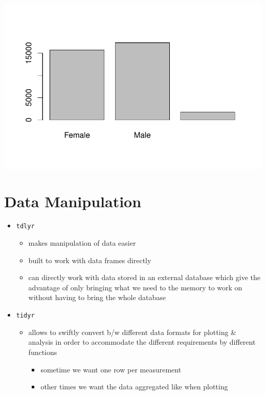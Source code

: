\documentclass[
  letterpaper,
  DIV=11,
  numbers=noendperiod]{scrreprt}
\providecommand{\tightlist}{%
  \setlength{\itemsep}{0pt}\setlength{\parskip}{0pt}}\usepackage{longtable,booktabs,array}
\begin{document}
\includegraphics{src/notebooks/r_files/figure-pdf/unnamed-chunk-21-1.pdf}

\section{Data Manipulation}\label{data-manipulation}

\begin{itemize}
\tightlist
\item
  \texttt{tdlyr}

  \begin{itemize}
  \tightlist
  \item
    makes manipulation of data easier
  \item
    built to work with data frames directly
  \item
    can directly work with data stored in an external database which
    give the advantage of only bringing what we need to the memory to
    work on without having to bring the whole database
  \end{itemize}
\item
  \texttt{tidyr}

  \begin{itemize}
  \tightlist
  \item
    allows to swiftly convert b/w different data formats for plotting \&
    analysis in order to accommodate the different requirements by
    different functions

    \begin{itemize}
    \tightlist
    \item
      sometime we want one row per measurement
    \item
      other times we want the data aggregated like when plotting
    \end{itemize}
  \end{itemize}
\end{itemize}
\end{document}
